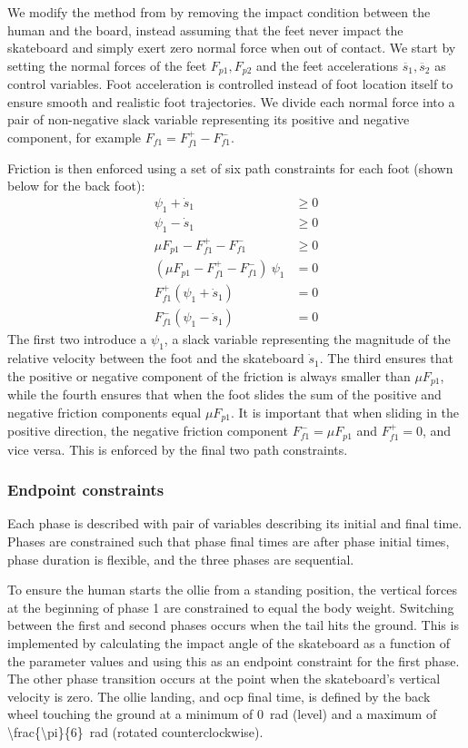 \documentclass[default,iicol]{sn-jnl}
\begin{document}
We modify the method from \cite{patel_contact-implicit_2019} by removing the impact condition between the human and the board, instead assuming that the feet never impact the skateboard and simply exert zero normal force when out of contact.
We start by setting the normal forces of the feet $F_{p1}, F_{p2}$ and the feet accelerations $\ddot{s_1}, \ddot{s_2}$ as control variables.
Foot acceleration is controlled instead of foot location itself to ensure smooth and realistic foot trajectories.
We divide each normal force into a pair of non-negative slack variable representing its positive and negative component, for example $F_{f1} = F_{f1}^+ - F_{f1}^-$.

Friction is then enforced using a set of six path constraints for each foot (shown below for the back foot):
\begin{align} \label{e_frictioncontrol}
    \psi_1 + \dot s_1  &\geq 0 \\
    \psi_1 - \dot s_1  &\geq 0 \\
    \mu F_{p1} - F_{f1}^+ - F_{f1}^- &\geq 0 \\
    (\mu F_{p1} - F_{f1}^+ - F_{f1}^-)\ \psi_1  &= 0 \\
    F_{f1}^+ (\psi_1 + \dot s_1)  &= 0 \\
    F_{f1}^- (\psi_1 - \dot s_1)  &= 0
\end{align}
The first two introduce a $\psi_1$, a slack variable representing the magnitude of the relative velocity between the foot and the skateboard $\dot{s}_1$. The third ensures that the positive or negative component of the friction is always smaller than $\mu F_{p1}$, while the fourth ensures that when the foot slides the sum of the positive and negative friction components equal $\mu F_{p1}$. It is important that when sliding in the positive direction, the negative friction component $F_{f1}^- = \mu F_{p1}$ and $F_{f1}^+=0$, and vice versa. This is enforced by the final two path constraints.

\subsubsection{Endpoint constraints} \label{p_endpoints}
Each phase is described with pair of variables describing its initial and final time. Phases are constrained such that phase final times are after phase initial times, phase duration is flexible, and the three phases are sequential.

To ensure the human starts the ollie from a standing position, the vertical forces at the beginning of phase 1 are constrained to equal the body weight.
Switching between the first and second phases occurs when the tail hits the ground.
This is implemented by calculating the impact angle of the skateboard as a function of the parameter values and using this as an endpoint constraint for the first phase.
The other phase transition occurs at the point when the skateboard's vertical velocity is zero.
The ollie landing, and \gls{ocp} final time, is defined by the back wheel touching the ground at a minimum of \SI{0}{\radian} (level) and a maximum of \SI[parse-numbers = false, number-math-rm = \ensuremath]{\frac{\pi}{6}}{\radian} (rotated counterclockwise).
\end{document}
